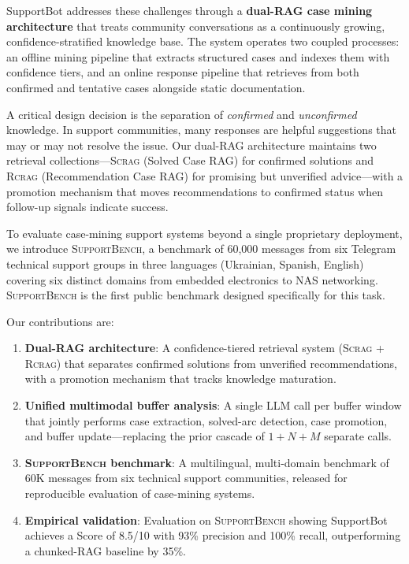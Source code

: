 \documentclass[11pt]{article}
\newcommand{\scrag}{\textsc{Scrag}}
\newcommand{\rcrag}{\textsc{Rcrag}}
\newcommand{\supportbench}{\textsc{SupportBench}}
\begin{document}
SupportBot addresses these challenges through a \textbf{dual-RAG case mining architecture} that treats community conversations as a continuously growing, confidence-stratified knowledge base. The system operates two coupled processes: an offline mining pipeline that extracts structured cases and indexes them with confidence tiers, and an online response pipeline that retrieves from both confirmed and tentative cases alongside static documentation.

A critical design decision is the separation of \emph{confirmed} and \emph{unconfirmed} knowledge. In support communities, many responses are helpful suggestions that may or may not resolve the issue. Our dual-RAG architecture maintains two retrieval collections---\scrag{} (Solved Case RAG) for confirmed solutions and \rcrag{} (Recommendation Case RAG) for promising but unverified advice---with a promotion mechanism that moves recommendations to confirmed status when follow-up signals indicate success.

To evaluate case-mining support systems beyond a single proprietary deployment, we introduce \supportbench{}, a benchmark of 60{,}000 messages from six Telegram technical support groups in three languages (Ukrainian, Spanish, English) covering six distinct domains from embedded electronics to NAS networking. \supportbench{} is the first public benchmark designed specifically for this task.

Our contributions are:
\begin{enumerate}
    \item \textbf{Dual-RAG architecture}: A confidence-tiered retrieval system (\scrag{} + \rcrag{}) that separates confirmed solutions from unverified recommendations, with a promotion mechanism that tracks knowledge maturation.
    \item \textbf{Unified multimodal buffer analysis}: A single LLM call per buffer window that jointly performs case extraction, solved-arc detection, case promotion, and buffer update---replacing the prior cascade of $1 + N + M$ separate calls.
    \item \textbf{\supportbench{} benchmark}: A multilingual, multi-domain benchmark of 60K messages from six technical support communities, released for reproducible evaluation of case-mining systems.
    \item \textbf{Empirical validation}: Evaluation on \supportbench{} showing SupportBot achieves a Score of 8.5/10 with 93\% precision and 100\% recall, outperforming a chunked-RAG baseline by 35\%.
\end{enumerate}
\end{document}
